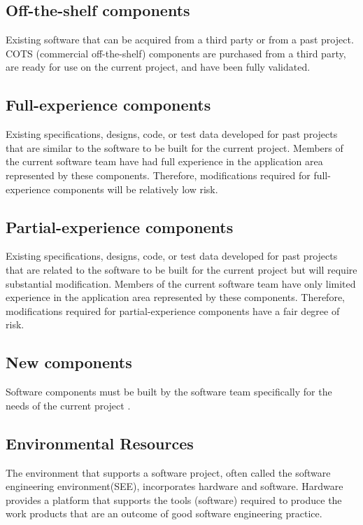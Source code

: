 \documentclass[12pt]{article}
\begin{document}
\subsection{Off-the-shelf components }
Existing software that can be acquired from a third
party or from a past project. COTS (commercial off-the-shelf) components are purchased from a third party, are ready for use on the current project, and have been
fully validated.

\subsection{Full-experience components}
Existing specifications, designs, code, or test data
developed for past projects that are similar to the software to be built for the
current project. Members of the current software team have had full experience
in the application area represented by these components. Therefore, modifications
required for full-experience components will be relatively low risk.

\subsection{Partial-experience components}
Existing specifications, designs, code, or test data
developed for past projects that are related to the software to be built for the current project but will require substantial modification. Members of the current software team have only limited experience in the application area represented by
these components. Therefore, modifications required for partial-experience components have a fair degree of risk.

\subsection{New components}
Software components must be built by the software team
specifically for the needs of the current project .

\subsection{Environmental Resources}

The environment that supports a software project, often called the software engineering environment(SEE), incorporates hardware and software. Hardware provides a platform that supports the tools (software) required to produce the work products that are an outcome of good software engineering practice.
\end{document}
